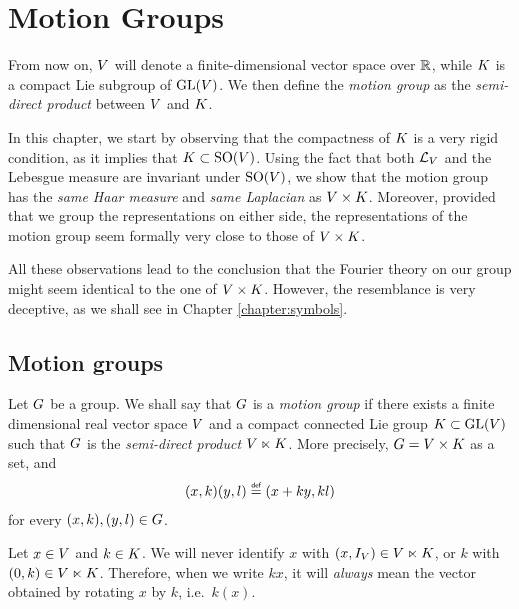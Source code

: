 \chapter{Motion Groups}

From now on,
$\VectorSpace$ will denote a finite-dimensional vector space over $\R$,
while $\CompactGroup$ is a compact Lie subgroup of $\GeneralLinear\VectorSpace$.
We then define the \emph{motion group} as the \emph{semi-direct product} between $\VectorSpace$ and $\CompactGroup$.

In this chapter,
we start by observing that the compactness of $\CompactGroup$ is a very rigid condition,
as it implies that $\CompactGroup \subset \SpecialOrthogonalGroup \VectorSpace$.
Using the fact that both $\Laplacian [\VectorSpace]$ and the Lebesgue measure are invariant under $\SpecialOrthogonalGroup \VectorSpace$,
we show that the motion group has the \emph{same Haar measure} and \emph{same Laplacian} as $\GroupDirect$.
Moreover,
provided that we group the representations on either side,
the representations of the motion group seem formally very close to those of $\GroupDirect$.

All these observations lead to the conclusion
that the Fourier theory on our group might seem identical to the one of $\GroupDirect$.
However,
the resemblance is very deceptive,
as we shall see in Chapter \ref{chapter:symbols}.

\section{Motion groups}

\begin{definition}
\label{definition:motion_group}
    Let $\Group$ be a group.
    We shall say that $\Group$ is a \emph{motion group}
    if there exists a finite dimensional real vector space $\VectorSpace$
    and a compact connected Lie group $\CompactGroup \subset \GeneralLinear\VectorSpace$
    such that $\Group$ is the \emph{semi-direct product} $\VectorSpace \ltimes \CompactGroup$.
    More precisely, $\Group = \VectorSpace \times \CompactGroup$ as a set, and
    \begin{align*}
        (x, k) (y, l) \defeq (x + ky, k l)
    \end{align*}
    for every $(x, k), (y, l) \in \Group$.
\end{definition}

\begin{remark}
\label{remark:notation_kx}
    Let $x \in \VectorSpace$ and $k \in \CompactGroup$.
    We will never identify $x$ with $(x, \Id{\VectorSpace}) \in \VectorSpace \ltimes \CompactGroup$,
    or $k$ with $(0, k) \in \VectorSpace \ltimes \CompactGroup$.
    Therefore, when we write $k x$, it will \emph{always} mean the vector obtained by rotating $x$ by $k$, i.e.\ $k(x)$.
\end{remark}

